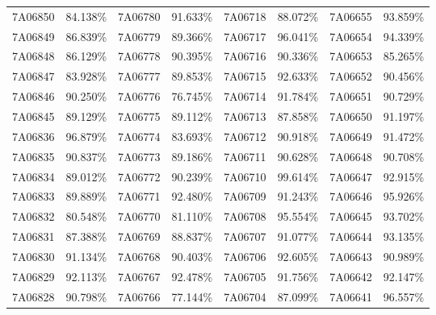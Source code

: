 \documentclass[12pt]{article}%
\begin{document}
\begin{longtable}{|cc|cc|cc|cc|}
7A06850              & 84.138\% & 7A06780              & 91.633\% & 7A06718              & 88.072\% & 7A06655              & 93.859\% \\
7A06849              & 86.839\% & 7A06779              & 89.366\% & 7A06717              & 96.041\% & 7A06654              & 94.339\% \\
7A06848              & 86.129\% & 7A06778              & 90.395\% & 7A06716              & 90.336\% & 7A06653              & 85.265\% \\
7A06847              & 83.928\% & 7A06777              & 89.853\% & 7A06715              & 92.633\% & 7A06652              & 90.456\% \\
7A06846              & 90.250\% & 7A06776              & 76.745\% & 7A06714              & 91.784\% & 7A06651              & 90.729\% \\
7A06845              & 89.129\% & 7A06775              & 89.112\% & 7A06713              & 87.858\% & 7A06650              & 91.197\% \\
7A06836              & 96.879\% & 7A06774              & 83.693\% & 7A06712              & 90.918\% & 7A06649              & 91.472\% \\
7A06835              & 90.837\% & 7A06773              & 89.186\% & 7A06711              & 90.628\% & 7A06648              & 90.708\% \\
7A06834              & 89.012\% & 7A06772              & 90.239\% & 7A06710              & 99.614\% & 7A06647              & 92.915\% \\
7A06833              & 89.889\% & 7A06771              & 92.480\% & 7A06709              & 91.243\% & 7A06646              & 95.926\% \\
7A06832              & 80.548\% & 7A06770              & 81.110\% & 7A06708              & 95.554\% & 7A06645              & 93.702\% \\
7A06831              & 87.388\% & 7A06769              & 88.837\% & 7A06707              & 91.077\% & 7A06644              & 93.135\% \\
7A06830              & 91.134\% & 7A06768              & 90.403\% & 7A06706              & 92.605\% & 7A06643              & 90.989\% \\
7A06829              & 92.113\% & 7A06767              & 92.478\% & 7A06705              & 91.756\% & 7A06642              & 92.147\% \\
7A06828              & 90.798\% & 7A06766              & 77.144\% & 7A06704              & 87.099\% & 7A06641              & 96.557\% \\

\end{longtable}
\end{document}
